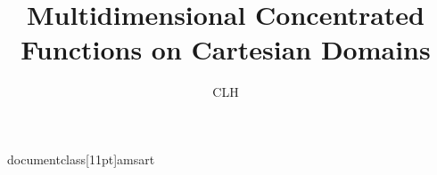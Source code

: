 \ documentclass[11pt]{amsart}
\usepackage{geometry}                %
\geometry{letterpaper}                   %
\usepackage{graphicx}
\usepackage{amssymb}
\usepackage{epstopdf}

\title{Multidimensional Concentrated Functions on Cartesian Domains}
\author{CLH}





\maketitle






  
